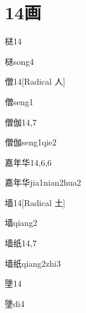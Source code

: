 
\section*{14画}

\begin{entry}{㮸}{14}
  \begin{phonetics}{㮸}{song4}
  \end{phonetics}
\end{entry}

\begin{entry}{僧}{14}[Radical 人]
  \begin{phonetics}{僧}{seng1}
  \end{phonetics}
\end{entry}

\begin{entry}{僧伽}{14,7}
  \begin{phonetics}{僧伽}{seng1qie2}
  \end{phonetics}
\end{entry}

\begin{entry}{嘉年华}{14,6,6}
  \begin{phonetics}{嘉年华}{jia1nian2hua2}
  \end{phonetics}
\end{entry}

\begin{entry}{墙}{14}[Radical 土]
  \begin{phonetics}{墙}{qiang2}
  \end{phonetics}
\end{entry}

\begin{entry}{墙纸}{14,7}
  \begin{phonetics}{墙纸}{qiang2zhi3}
  \end{phonetics}
\end{entry}

\begin{entry}{墬}{14}
  \begin{phonetics}{墬}{di4}
  \end{phonetics}
\end{entry}

